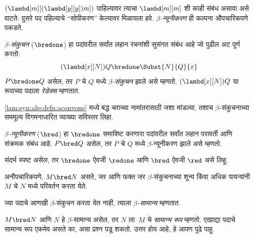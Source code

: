 $(\lambd[m][(\lambd[y][y]) m])$ पाहिल्यावर त्याचा
$\lambd[m][m]$ शी काही संबंध असावा असे वाटते:
दुसरे पद पहिल्याचे ``सोपीकरण'' केल्यावर मिळायला हवे.
\emph{$\beta$-न्यूनीकरण} ही कल्पना औपचारिकपणे पकडते.

\begin{defn} \label{lam:int:bet:defn:betacontr}
  \emph{$\beta$-संकुचन} ($\bredone$) हा पदांवरील
  सर्वांत लहान रचनांशी सुसंगत संबंध आहे जो पुढील अट पूर्ण करतो:
  \[    (\lambd[x][N])Q \bredone \Subst{N}{Q}{x}
  \]
  $P \bredone Q$ असेल, तर $P$ चे $Q$ मध्ये
  \emph{$\beta$-संकुचन} झाले असे म्हणतो.
  $(\lambd[x][N])Q$ या रूपाच्या पदाला \emph{रेडेक्स} म्हणतात.
\end{defn}

\begin{prob} \label{lam:int:bet:prob:def}
  \ref{lam:syn:alp:defn:aconvone} मध्ये बद्ध चराच्या
  नामांतरासाठी जशा मांडल्या, तशाच $\beta$-संकुचनाच्या
  सममूल्य विगमनाधारित व्याख्या सविस्तर लिहा.
\end{prob}

\begin{defn} \label{lam:int:bet:defn:betared}
  \emph{$\beta$-न्यूनीकरण} ($\bred$) हा $\bredone$
  समाविष्ट करणारा पदांवरील सर्वांत लहान परावर्ती आणि
  संक्रमक संबंध आहे. $P \bred Q$ असेल, तर $P$ चे
  $Q$ मध्ये $\beta$-न्यूनीकरण झाले असे म्हणतो.
\end{defn}

संदर्भ स्पष्ट असेल, तर $\bredone$ ऐवजी $\redone$
आणि $\bred$ ऐवजी $\red$ असे लिहू.

अनौपचारिकपणे, $M \bred N$ असते, जर आणि फक्त जर
$\beta$-संकुचनाच्या शून्य किंवा अधिक पायऱ्यांनी
$M$ चे $N$ मध्ये परिवर्तन करता येते.

\begin{defn}[$\beta$-सामान्य]
ज्या पदाचे आणखी $\beta$-संकुचन करता येत नाही,
त्याला \emph{$\beta$-सामान्य} म्हणतात.
\end{defn}

$M \bred N$ आणि $N$ हे $\beta$-सामान्य असेल, तर
$N$ ला~$M$ चे \emph{सामान्य रूप} म्हणतो. एखाद्या पदाचे
सामान्य रूप एकमेव असते का, असा प्रश्न पडू शकतो.
उत्तर होय आहे, हे आपण पुढे पाहू.

